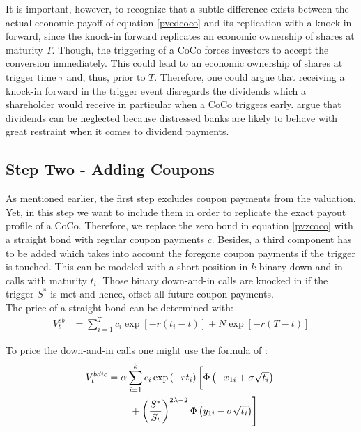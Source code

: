 %

It is important, however, to recognize that a subtle difference exists between the actual economic payoff of equation \ref{pvedcoco} and its replication with a knock-in forward, since the knock-in forward replicates an economic ownership of shares at maturity $T$. Though, the triggering of a CoCo forces investors to accept the conversion immediately. This could lead to an economic ownership of shares at trigger time $\tau$ and, thus, prior to $T$. Therefore, one could argue that receiving a knock-in forward in the trigger event disregards the dividends which a shareholder would receive in particular when a CoCo triggers early. \citet{de2011pricing} argue that dividends can be neglected because distressed banks are likely to behave with great restraint when it comes to dividend payments.

\subsection{Step Two - Adding Coupons}
As mentioned earlier, the first step excludes coupon payments from the valuation. Yet, in this step we want to include them in order to replicate the exact payout profile of a CoCo. Therefore, we replace the zero bond in equation \ref{pvzcoco} with a straight bond with regular coupon payments $c$. Besides, a third component has to be added which takes into account the foregone coupon payments if the trigger is touched. This can be modeled with a short position in $k$ binary down-and-in calls with maturity $t_i$. Those binary down-and-in calls are knocked in if the trigger $S^*$ is met and hence, offset all future coupon payments.\\ 

The price of a straight bond can be determined with:
\begin{align}
V^{sb}_t &= \sum^T_{i=1} c_i \exp\left[-r (t_i - t)\right] + N \exp\left[-r (T-t) \right]
\end{align}

To price the down-and-in calls one might use the formula of \citet{rubinstein1991unscrambling}:
\begin{align}
    V_t^{bdic} &= \alpha \sum^k_{i=1} c_i \exp\left(-r t_i\right) \left[ \Phi\left(-x_{1i} + \sigma \sqrt{t_i}\right)\vphantom{\dfrac{S^*}{S}}\right.\nonumber\\
   &\qquad \left.\vphantom{\dfrac{S^*}{S_t}} +\left(\dfrac{S^*}{S_t}\right)^{2\lambda -2} \Phi\left(y_{1i} - \sigma \sqrt{t_i}\right) \right]
\end{align}

